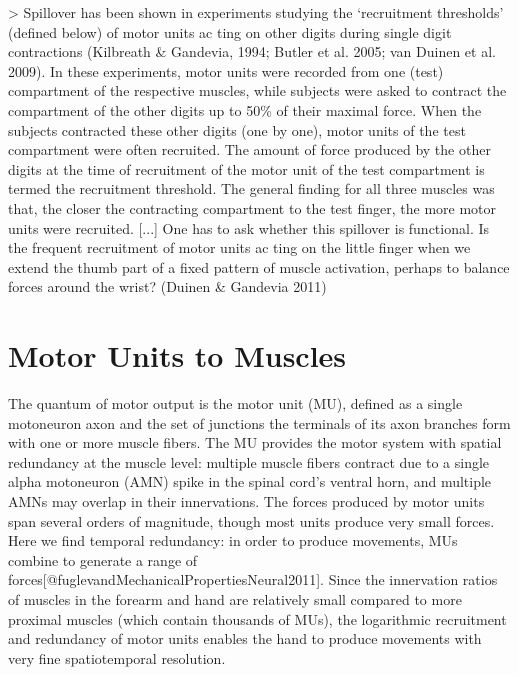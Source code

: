 \documentclass[../main.tex]{subfiles}
\begin{document}
> Spillover has been shown in experiments studying the ‘recruitment thresholds’ (defined below) of motor units ac ting on other digits during single digit contractions (Kilbreath \& Gandevia, 1994; Butler et al. 2005; van Duinen et al. 2009). In these experiments, motor units were recorded from one (test) compartment of the respective muscles, while subjects were asked to contract the compartment of the other digits up to 50\% of their maximal force. When the subjects contracted these other digits (one by one), motor units of the test compartment were often recruited. The amount of force produced by the other digits at the time of recruitment of the motor unit of the test compartment is termed the recruitment threshold. The general finding for all three muscles was that, the closer the contracting compartment to the test finger, the more motor units were recruited. [...] One has to ask whether this spillover is functional. Is the frequent recruitment of motor units ac ting on the little finger when we extend the thumb part of a fixed pattern of muscle activation, perhaps to balance forces around the wrist? (Duinen \& Gandevia 2011) 

























\section{Motor Units to Muscles}\label{motor-units-to-muscles}

The quantum of motor output is the motor unit (MU), defined as a single motoneuron axon and the set of junctions the terminals of its axon branches form with one or more muscle fibers. The MU provides the motor system with spatial redundancy at the muscle level: multiple muscle fibers contract due to a single alpha motoneuron (AMN) spike in the spinal cord's ventral horn, and multiple AMNs may overlap in their innervations. The forces produced by motor units span several orders of magnitude, though most units produce very small forces. Here we find temporal redundancy: in order to produce movements, MUs combine to generate a range of forces{[}@fuglevandMechanicalPropertiesNeural2011{]}. Since the innervation ratios of muscles in the forearm and hand are relatively small compared to more proximal muscles (which contain thousands of MUs), the logarithmic recruitment and redundancy of motor units enables the hand to produce movements with very fine spatiotemporal resolution.
\end{document}
